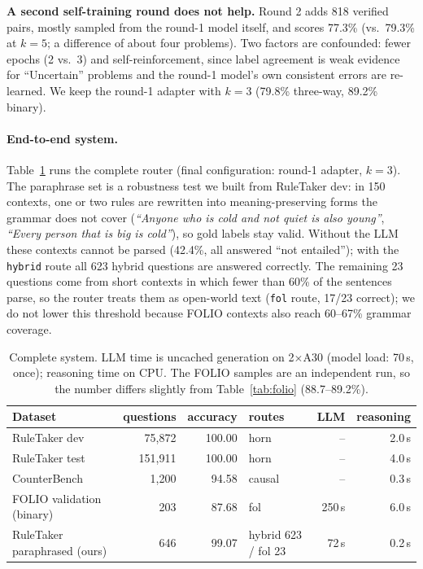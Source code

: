 \documentclass[10pt,a4paper]{article}
\begin{document}
\noindent\textbf{A second self-training round does not help.} Round 2 adds 818 verified pairs, mostly sampled from the round-1 model itself, and scores 77.3\% (vs.\ 79.3\% at $k{=}5$; a difference of about four problems). Two factors are confounded: fewer epochs (2 vs.\ 3) and self-reinforcement, since label agreement is weak evidence for ``Uncertain'' problems and the round-1 model's own consistent errors are re-learned. We keep the round-1 adapter with $k{=}3$ (79.8\% three-way, 89.2\% binary).

\paragraph{End-to-end system.} Table~\ref{tab:e2e} runs the complete router (final configuration: round-1 adapter, $k{=}3$). The paraphrase set is a robustness test we built from RuleTaker dev: in 150 contexts, one or two rules are rewritten into meaning-preserving forms the grammar does not cover (\emph{``Anyone who is cold and not quiet is also young''}, \emph{``Every person that is big is cold''}), so gold labels stay valid. Without the LLM these contexts cannot be parsed (42.4\%, all answered ``not entailed''); with the \texttt{hybrid} route all 623 hybrid questions are answered correctly. The remaining 23 questions come from short contexts in which fewer than 60\% of the sentences parse, so the router treats them as open-world text (\texttt{fol} route, 17/23 correct); we do not lower this threshold because FOLIO contexts also reach 60--67\% grammar coverage.

\begin{table}[H]
\centering\small
\caption{Complete system. LLM time is uncached generation on 2$\times$A30 (model load: 70\,s, once); reasoning time on CPU. The FOLIO samples are an independent run, so the number differs slightly from Table~\ref{tab:folio} (88.7--89.2\%).}
\label{tab:e2e}
\begin{tabular}{@{}lrrlrr@{}}
\toprule
Dataset & questions & accuracy & routes & LLM & reasoning \\
\midrule
RuleTaker dev & 75{,}872 & 100.00 & horn & -- & 2.0\,s \\
RuleTaker test & 151{,}911 & 100.00 & horn & -- & 4.0\,s \\
CounterBench & 1{,}200 & 94.58 & causal & -- & 0.3\,s \\
FOLIO validation (binary) & 203 & 87.68 & fol & 250\,s & 6.0\,s \\
RuleTaker paraphrased (ours) & 646 & 99.07 & hybrid 623 / fol 23 & 72\,s & 0.2\,s \\
\bottomrule
\end{tabular}
\end{table}
\end{document}
